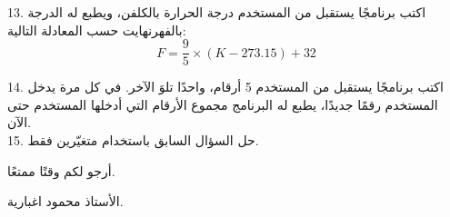 \documentclass[12pt]{article}
\begin{document}
13. اكتب برنامجًا يستقبل من المستخدم درجة الحرارة بالكلفن، ويطبع له الدرجة بالفهرنهايت حسب المعادلة التالية:
\[
F = \frac{9}{5} \times (K - 273.15) + 32
\]

14. اكتب برنامجًا يستقبل من المستخدم 5 أرقام، واحدًا تلوَ الآخر. في كل مرة يدخل المستخدم رقمًا جديدًا، يطبع له البرنامج مجموع الأرقام التي أدخلها المستخدم حتى الآن.
\\

15. حل السؤال السابق باستخدام متغيّرين فقط.

\vspace{3cm}
\begin{flushleft}
أرجو لكم وقتًا ممتعًا.

الأستاذ محمود اغبارية.
\end{flushleft}
\end{document}

